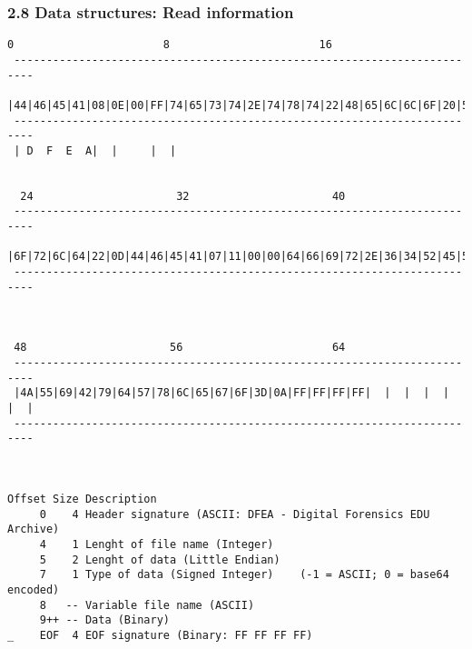 \begin{frame}[fragile]
  \frametitle{2.8 Data structures: Read information}
\begin{lstlisting}[basicstyle=\tiny]
  0                       8                       16                      
 ------------------------------------------------------------------------- 
 |44|46|45|41|08|0E|00|FF|74|65|73|74|2E|74|78|74|22|48|65|6C|6C|6F|20|57|
 -------------------------------------------------------------------------
 | D  F  E  A|  |     |  |                                             


  24                      32                      40
 -------------------------------------------------------------------------
 |6F|72|6C|64|22|0D|44|46|45|41|07|11|00|00|64|66|69|72|2E|36|34|52|45|5A|
 -------------------------------------------------------------------------
                   


 48                      56                       64
 -------------------------------------------------------------------------
 |4A|55|69|42|79|64|57|78|6C|65|67|6F|3D|0A|FF|FF|FF|FF|  |  |  |  |  |  |
 -------------------------------------------------------------------------



Offset Size Description
     0    4 Header signature (ASCII: DFEA - Digital Forensics EDU Archive)
     4    1 Lenght of file name (Integer)
     5    2 Lenght of data (Little Endian)
     7    1 Type of data (Signed Integer)    (-1 = ASCII; 0 = base64 encoded)
     8   -- Variable file name (ASCII)
     9++ -- Data (Binary)
_    EOF  4 EOF signature (Binary: FF FF FF FF)
\end{lstlisting}
\end{frame}


